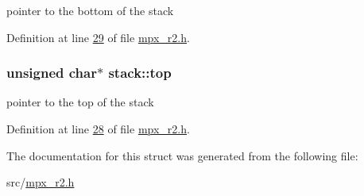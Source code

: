 pointer to the bottom of the stack 



Definition at line \hyperlink{mpx__r2_8h_source_l00029}{29} of file \hyperlink{mpx__r2_8h_source}{mpx\_\-r2.h}.

\hypertarget{structstack_adf145fa22a24464ff19409e2618a583d}{
\subsubsection[{top}]{\setlength{\rightskip}{0pt plus 5cm}unsigned char$\ast$ {\bf stack::top}}}
\label{structstack_adf145fa22a24464ff19409e2618a583d}


pointer to the top of the stack 



Definition at line \hyperlink{mpx__r2_8h_source_l00028}{28} of file \hyperlink{mpx__r2_8h_source}{mpx\_\-r2.h}.



The documentation for this struct was generated from the following file:\begin{DoxyCompactItemize}
\item 
src/\hyperlink{mpx__r2_8h}{mpx\_\-r2.h}\end{DoxyCompactItemize}
